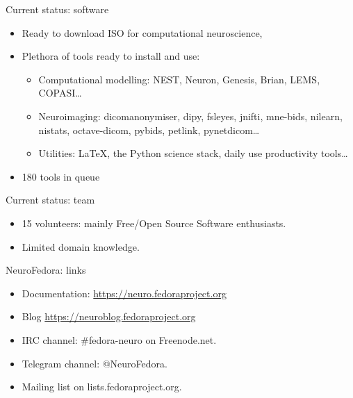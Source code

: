 \begin{frame}[c]{Current status: software}
  \begin{itemize}
    \item Ready to download ISO for computational neuroscience,
      \pause{}
    \item Plethora of tools ready to install and use:
      \begin{itemize}
        \item \alert{Computational modelling:} NEST, Neuron, Genesis, Brian, LEMS, COPASI\ldots
        \item \alert{Neuroimaging:} dicomanonymiser, dipy, fsleyes, jnifti, mne-bids, nilearn, nistats, octave-dicom, pybids, petlink, pynetdicom\ldots
        \item \alert{Utilities}: \LaTeX{}, the Python science stack, daily use productivity tools\ldots
      \end{itemize}
      \pause{}
    \item \alert{180} tools in queue\footnotemark[1]
  \end{itemize}
\end{frame}
\begin{frame}[c]{Current status: team}
  \begin{itemize}
      \item 15 \alert{volunteers:} mainly Free/Open Source Software enthusiasts.
      \item Limited domain knowledge.
  \end{itemize}
\end{frame}
\begin{frame}[c]{NeuroFedora: links}
  \begin{itemize}
    \item Documentation: \url{https://neuro.fedoraproject.org} 
    \item Blog \url{https://neuroblog.fedoraproject.org} 
    \item IRC channel: \#fedora-neuro on Freenode.net\footnotemark.
    \item Telegram channel: @NeuroFedora\footnotemark.
    \item Mailing list on lists.fedoraproject.org\footnotemark.
  \end{itemize}
\end{frame}
